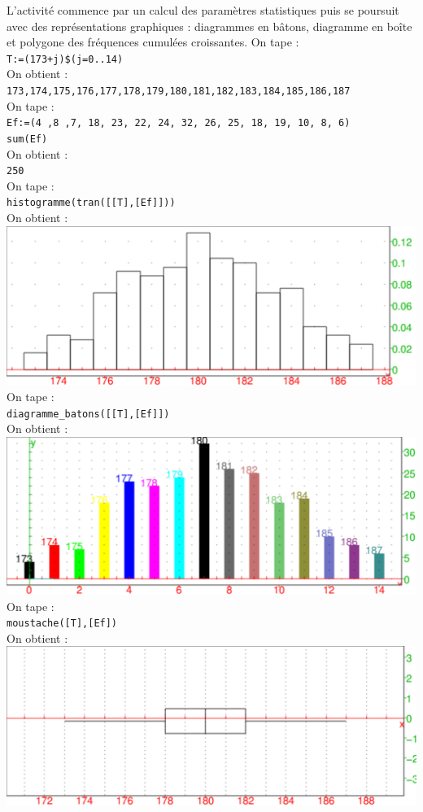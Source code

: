\documentclass[a4paper,11pt]{book}
\begin{document}
L’activité commence par un calcul des paramètres statistiques puis se poursuit 
avec des représentations
graphiques : diagrammes en bâtons, diagramme en boîte et polygone des fréquences cumulées croissantes.
On tape :\\
{\tt T:=(173+j)\$(j=0..14)}\\
On obtient :\\
{\tt 173,174,175,176,177,178,179,180,181,182,183,184,185,186,187}\\
On tape :\\
{\tt Ef:=(4 ,8 ,7, 18, 23, 22, 24, 32, 26, 25, 18, 19, 10, 8, 6)}\\
{\tt sum(Ef)}\\
On obtient :\\
{\tt 250}\\
On tape :\\
{\tt histogramme(tran([[T],[Ef]]))}\\
On obtient :\\
\includegraphics[width=\textwidth]{stathisto}\\
On tape :\\
{\tt diagramme\_batons([[T],[Ef]])}\\
On obtient :\\
\includegraphics[width=\textwidth]{statdiag}\\
On tape :\\
{\tt moustache([T],[Ef])}\\
On obtient :\\
\includegraphics[width=\textwidth]{statmoust}\\
\end{document}
